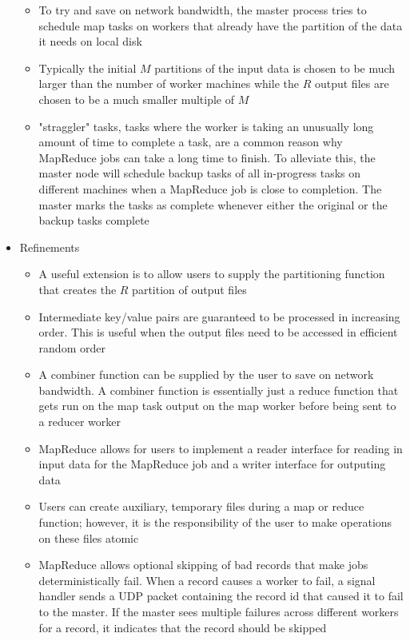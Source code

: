 \documentclass[a4paper]{article}
\begin{document}
\begin{itemize}
\begin{itemize}
\item To try and save on network bandwidth, the master process tries to schedule map tasks on workers that already have the partition of the data it needs on local disk

\item Typically the initial $M$ partitions of the input data is chosen to be much larger than the number of worker machines while the $R$ output files are chosen to be a much smaller multiple of $M$

\item "straggler" tasks, tasks where the worker is taking an unusually long amount of time to complete a task, are a common reason why MapReduce jobs can take a long time to finish. To alleviate this, the master node will schedule backup tasks of all in-progress tasks on different machines when a MapReduce job is close to completion. The master marks the tasks as complete whenever either the original or the backup tasks complete

\end{itemize}

\item Refinements
\begin{itemize}
\item A useful extension is to allow users to supply the partitioning function that creates the $R$ partition of output files

\item Intermediate key/value pairs are guaranteed to be processed in increasing order. This is useful when the output files need to be accessed in efficient random order

\item A combiner function can be supplied by the user to save on network bandwidth. A combiner function is essentially just a reduce function that gets run on the map task output on the map worker before being sent to a reducer worker

\item MapReduce allows for users to implement a reader interface for reading in input data for the MapReduce job and a writer interface for outputing data

\item Users can create auxiliary, temporary files during a map or reduce function; however, it is the responsibility of the user to make operations on these files atomic

\item MapReduce allows optional skipping of bad records that make jobs deterministically fail. When a record causes a worker to fail, a signal handler sends a UDP packet containing the record id that caused it to fail to the master. If the master sees multiple failures across different workers for a record, it indicates that the record should be skipped


\end{itemize}
\end{itemize}
\end{document}
